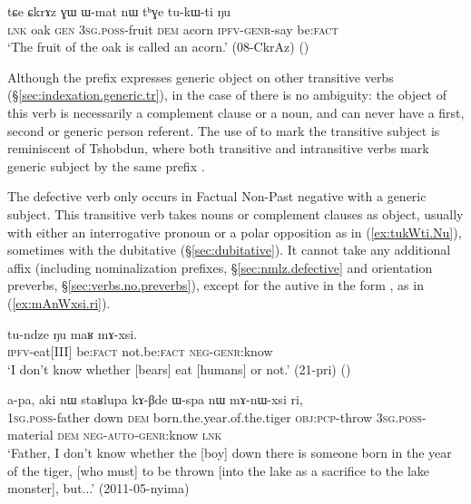 \begin{exe}
\ex   \label{ex:tukWti.Nu}
 \gll   tɕe ɕkrɤz ɣɯ ɯ-mat nɯ tʰɣe tu-kɯ-ti ŋu \\
 \textsc{lnk} oak \textsc{gen} \textsc{3sg}.\textsc{poss}-fruit \textsc{dem} acorn \textsc{ipfv}-\textsc{genr}-say be:\textsc{fact} \\
 \glt `The fruit of the oak is called an acorn.' (08-CkrAz)
()
\end{exe}

Although the prefix  expresses generic object on other transitive verbs (§\ref{sec:indexation.generic.tr}), in the case of  there is no ambiguity: the object of this verb is necessarily a complement clause or a noun, and can never have a first, second or generic person referent.  The use of  to mark the transitive subject is reminiscent of Tshobdun, where both transitive and intransitive verbs mark generic subject by the same prefix \citep{sun14generic}. 

The defective verb  only occurs in Factual Non-Past negative with a generic subject. This transitive verb takes nouns or complement clauses as object, usually with either an interrogative pronoun or a polar opposition as in (\ref{ex:tukWti.Nu}), sometimes with the dubitative (§\ref{sec:dubitative}). It cannot take any additional affix (including nominalization prefixes, §\ref{sec:nmlz.defective} and orientation preverbs, §\ref{sec:verbs.no.preverbs}), except for the autive  in the form , as in (\ref{ex:mAnWxsi.ri}). 

\begin{exe}
\ex   \label{ex:Nu.maR.mAxsi}
 \gll  tu-ndze ŋu maʁ mɤ-xsi. \\
 \textsc{ipfv}-eat[III] be:\textsc{fact} not.be:\textsc{fact} \textsc{neg}-\textsc{genr}:know \\
 \glt `I don't know whether [bears] eat [humans] or not.' (21-pri) ()
\end{exe}

\begin{exe}
\ex   \label{ex:mAnWxsi.ri}
 \gll a-pa, aki nɯ staʁlupa kɤ-βde ɯ-spa nɯ mɤ-nɯ-xsi ri, \\
 \textsc{1sg}.\textsc{poss}-father down \textsc{dem} born.the.year.of.the.tiger \textsc{obj}:\textsc{pcp}-throw \textsc{3sg}.\textsc{poss}-material \textsc{dem} \textsc{neg}-\textsc{auto}-\textsc{genr}:know \textsc{lnk} \\
 \glt `Father, I don't know whether the [boy] down there is someone born in the year of the tiger, [who must] to be thrown [into the lake as a sacrifice to the lake monster], but...' (2011-05-nyima)
\end{exe}

